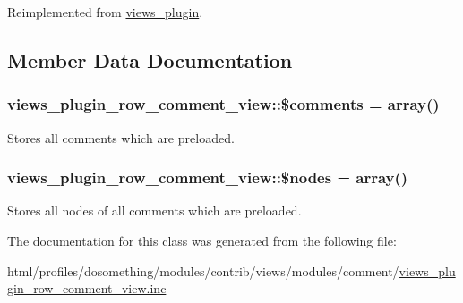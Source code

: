Reimplemented from \hyperlink{classviews__plugin_a9a4aaece48a7cf465dd95d59a3bc5ea1}{views\_\-plugin}.

\subsection{Member Data Documentation}
\hypertarget{classviews__plugin__row__comment__view_a017d0a21f9c2877a62195ebb57f021d6}{
\subsubsection[{\$comments}]{\setlength{\rightskip}{0pt plus 5cm}views\_\-plugin\_\-row\_\-comment\_\-view::\$comments = array()}}
\label{classviews__plugin__row__comment__view_a017d0a21f9c2877a62195ebb57f021d6}
Stores all comments which are preloaded. \hypertarget{classviews__plugin__row__comment__view_a05699b969b37f545ce6c43329f2555ec}{
\subsubsection[{\$nodes}]{\setlength{\rightskip}{0pt plus 5cm}views\_\-plugin\_\-row\_\-comment\_\-view::\$nodes = array()}}
\label{classviews__plugin__row__comment__view_a05699b969b37f545ce6c43329f2555ec}
Stores all nodes of all comments which are preloaded. 

The documentation for this class was generated from the following file:\begin{DoxyCompactItemize}
\item 
html/profiles/dosomething/modules/contrib/views/modules/comment/\hyperlink{views__plugin__row__comment__view_8inc}{views\_\-plugin\_\-row\_\-comment\_\-view.inc}\end{DoxyCompactItemize}
